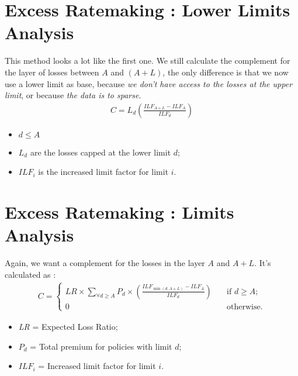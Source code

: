 \documentclass[11pt, english]{memoir}
\numberwithin{definition}{section}
\begin{document}
\section{Excess Ratemaking : Lower Limits Analysis}
This method looks a lot like the first one. We still calculate the complement for the layer of losses between $ A $ and $ (A + L) $, the only difference is that we now use a lower limit as base, because \emph{we don't have access to the losses at the upper limit}, or because \emph{the data is to sparse}.   
\begin{align*}
C = L_{d} \left( \frac{ILF_{A+L} - ILF_{A}}{ILF_{d}} \right) 
\end{align*}
\begin{itemize}
	\item $ d \leq A $
	\item $ L_{d} $ are the losses capped at the lower limit $ d $; 
	\item $ ILF_{i} $ is the increased limit factor for limit $ i $. 
\end{itemize}


\section{Excess Ratemaking : Limits Analysis}

Again, we want a complement for the losses in the layer $ A $ and $ A + L $. It's calculated as : 
\begin{align*}
C = 
\begin{cases}
LR \times \sum_{\forall d \geq A} P_{d} \times \left( \frac{ILF_{\min(d, A+L)} - ILF_{A}}{ILF_{d}} \right) \quad & \text{if } d\geq A; \\
0 \quad & \text{otherwise}.
\end{cases}
\end{align*}
\begin{itemize}
	\item \emph{LR} = Expected Loss Ratio;
	\item  $ P_{d} $ = Total premium for policies with limit $ d $;
	\item $ ILF_{i} $ = Increased limit factor for limit $ i $.
\end{itemize}
\end{document}
